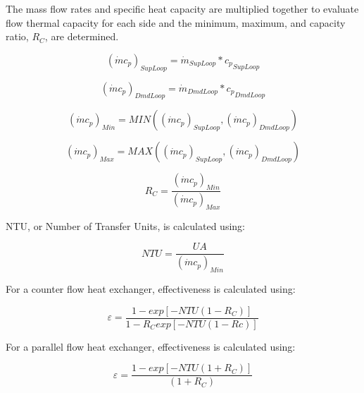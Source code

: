 The mass flow rates and specific heat capacity are multiplied together to evaluate flow thermal capacity for each side and the minimum, maximum, and capacity ratio, \({R_C}\), are determined.

\begin{equation}
{\left( {\dot m{c_p}} \right)_{SupLoop}} = {\dot m_{SupLoop}}*{c_p}_{SupLoop}
\end{equation}

\begin{equation}
{\left( {\dot m{c_p}} \right)_{DmdLoop}} = {\dot m_{DmdLoop}}*{c_p}_{DmdLoop}
\end{equation}

\begin{equation}
{\left( {\dot m{c_p}} \right)_{Min}} = MIN\left( {{{\left( {\dot m{c_p}} \right)}_{SupLoop}},{{\left( {\dot m{c_p}} \right)}_{DmdLoop}}} \right)
\end{equation}

\begin{equation}
{\left( {\dot m{c_p}} \right)_{Max}} = MAX\left( {{{\left( {\dot m{c_p}} \right)}_{SupLoop}},{{\left( {\dot m{c_p}} \right)}_{DmdLoop}}} \right)
\end{equation}

\begin{equation}
{R_C} = \frac{{{{\left( {\dot m{c_p}} \right)}_{Min}}}}{{{{\left( {\dot m{c_p}} \right)}_{Max}}}}
\end{equation}

NTU, or Number of Transfer Units, is calculated using:

\begin{equation}
NTU = \frac{{UA}}{{{{\left( {\dot m{c_p}} \right)}_{Min}}}}
\end{equation}

For a counter flow heat exchanger, effectiveness is calculated using:

\begin{equation}
\varepsilon  = \frac{{1 - exp\left[ { - NTU\left( {1 - {R_C}} \right)} \right]}}{{1 - {R_C}exp\left[ { - NTU\left( {1 - Rc} \right)} \right]}}
\end{equation}

For a parallel flow heat exchanger, effectiveness is calculated using:

\begin{equation}
\varepsilon  = \frac{{1 - exp\left[ { - NTU\left( {1 + {R_C}} \right)} \right]}}{{\left( {1 + {R_C}} \right)}}
\end{equation}

